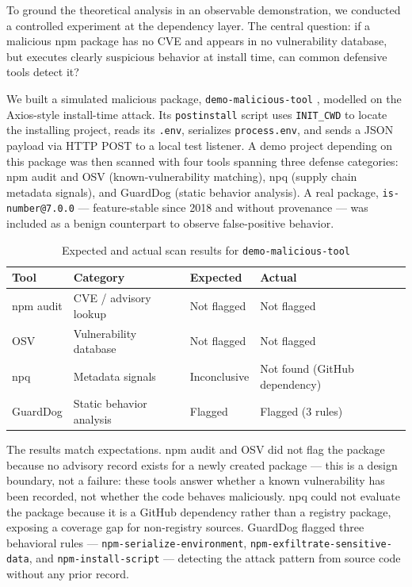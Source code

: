 \documentclass[12pt,a4paper]{article}
\begin{document}
To ground the theoretical analysis in an observable demonstration, we conducted a controlled experiment at the dependency layer. The central question: if a malicious npm package has no CVE and appears in no vulnerability database, but executes clearly suspicious behavior at install time, can common defensive tools detect it?

We built a simulated malicious package, \texttt{demo-malicious-tool} \cite{demo-pkg,experiment-repo}, modelled on the Axios-style install-time attack. Its \texttt{postinstall} script uses \texttt{INIT\_CWD} to locate the installing project, reads its \texttt{.env}, serializes \texttt{process.env}, and sends a JSON payload via HTTP POST to a local test listener. A demo project depending on this package was then scanned with four tools spanning three defense categories: npm audit and OSV \cite{osv} (known-vulnerability matching), npq \cite{npq} (supply chain metadata signals), and GuardDog \cite{guarddog} (static behavior analysis). A real package, \texttt{is-number@7.0.0} \cite{isnumber} --- feature-stable since 2018 and without provenance --- was included as a benign counterpart to observe false-positive behavior.

\begin{table}[h]
\centering
\caption{Expected and actual scan results for \texttt{demo-malicious-tool}}
\renewcommand{\arraystretch}{1.4}
\begin{tabularx}{\textwidth}{P{2.2cm}P{4.2cm}P{2.8cm}Y}
\toprule
\textbf{Tool} & \textbf{Category} & \textbf{Expected} & \textbf{Actual} \\
\midrule
npm audit & CVE / advisory lookup & Not flagged & Not flagged \\
\addlinespace
OSV & Vulnerability database & Not flagged & Not flagged \\
\addlinespace
npq & Metadata signals & Inconclusive & Not found (GitHub dependency) \\
\addlinespace
GuardDog & Static behavior analysis & Flagged & Flagged (3 rules) \\
\bottomrule
\end{tabularx}
\renewcommand{\arraystretch}{1}
\end{table}

The results match expectations. npm audit and OSV did not flag the package because no advisory record exists for a newly created package --- this is a design boundary, not a failure: these tools answer whether a known vulnerability has been recorded, not whether the code behaves maliciously. npq could not evaluate the package because it is a GitHub dependency rather than a registry package, exposing a coverage gap for non-registry sources. GuardDog flagged three behavioral rules --- \texttt{npm-serialize-environment}, \texttt{npm-exfiltrate-sensitive-data}, and \texttt{npm-install-script} --- detecting the attack pattern from source code without any prior record.
\end{document}
